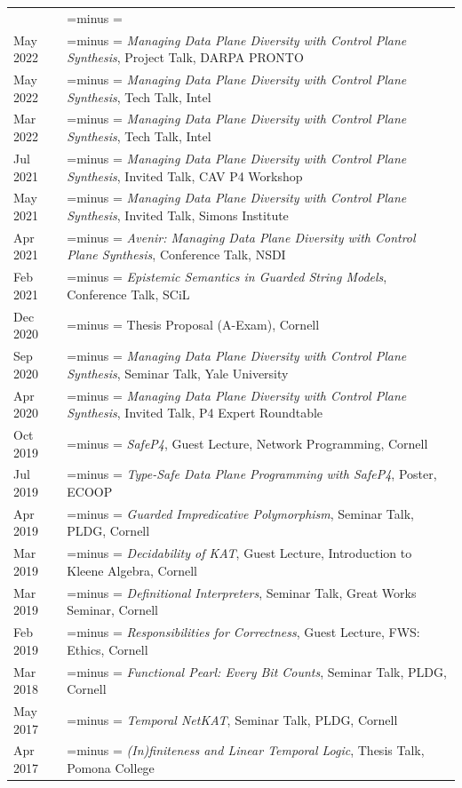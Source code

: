 \documentclass[letterpaper,10pt,oneside]{article}
\makeatletter
\newlength{\leftcol}  \setlength{\leftcol}{1.05in}
\newlength{\colsep}   \setlength{\colsep}{1em}
\newlength{\rightcol}
\newcommand{\balancedrag}{%
  \setlength{\rightskip}{0pt plus 0.45\rightcol}%
  \setlength{\parfillskip}{0pt}%
  \spaceskip=\fontdimen2\font minus \fontdimen4\font
  \xspaceskip=\spaceskip
  \hbadness=10000 \hyphenpenalty=10000 \exhyphenpenalty=10000 \emergencystretch=0pt}
\newenvironment{cvsection}[1]
  {\par\vspace{0.9em}%
   \setlength{\rightcol}{\dimexpr\linewidth-\leftcol-\colsep\relax}%
   \noindent\begin{longtable}[l]{@{}>{\raggedleft\arraybackslash}p{\leftcol}@{\hspace{\colsep}}>{\raggedright\balancedrag\arraybackslash}p{\rightcol}@{}}
   \multicolumn{2}{@{}l}{\Large #1} \\*\noalign{\nobreak\vspace{0.4em}}}
  {\end{longtable}}
\makeatother
\begin{document}
\begin{cvsection}{Talks \& Posters}
  May 2022 & \textit{Managing Data Plane Diversity with Control Plane Synthesis}, Project Talk, DARPA PRONTO \\[0.3em]
  May 2022 & \textit{Managing Data Plane Diversity with Control Plane Synthesis}, Tech Talk, Intel \\[0.3em]
  Mar 2022 & \textit{Managing Data Plane Diversity with Control Plane Synthesis}, Tech Talk, Intel \\[0.3em]
  Jul 2021 & \textit{Managing Data Plane Diversity with Control Plane Synthesis}, Invited Talk, CAV P4 Workshop \\[0.3em]
  May 2021 & \textit{Managing Data Plane Diversity with Control Plane Synthesis}, Invited Talk, Simons Institute \\[0.3em]
  Apr 2021 & \textit{Avenir: Managing Data Plane Diversity with Control Plane Synthesis}, Conference Talk, NSDI \\[0.3em]
  Feb 2021 & \textit{Epistemic Semantics in Guarded String Models}, Conference Talk, SCiL \\[0.3em]
  Dec 2020 & Thesis Proposal (A-Exam), Cornell \\[0.3em]
  Sep 2020 & \textit{Managing Data Plane Diversity with Control Plane Synthesis}, Seminar Talk, Yale University \\[0.3em]
  Apr 2020 & \textit{Managing Data Plane Diversity with Control Plane Synthesis}, Invited Talk, P4 Expert Roundtable \\[0.3em]
  Oct 2019 & \textit{SafeP4}, Guest Lecture, Network Programming, Cornell \\[0.3em]
  Jul 2019 & \textit{Type-Safe Data Plane Programming with SafeP4}, Poster, ECOOP \\[0.3em]
  Apr 2019 & \textit{Guarded Impredicative Polymorphism}, Seminar Talk, PLDG, Cornell \\[0.3em]
  Mar 2019 & \textit{Decidability of KAT}, Guest Lecture, Introduction to Kleene Algebra, Cornell \\[0.3em]
  Mar 2019 & \textit{Definitional Interpreters}, Seminar Talk, Great Works Seminar, Cornell \\[0.3em]
  Feb 2019 & \textit{Responsibilities for Correctness}, Guest Lecture, FWS: Ethics, Cornell \\[0.3em]
  Mar 2018 & \textit{Functional Pearl: Every Bit Counts}, Seminar Talk, PLDG, Cornell \\[0.3em]
  May 2017 & \textit{Temporal NetKAT}, Seminar Talk, PLDG, Cornell \\[0.3em]
  Apr 2017 & \textit{(In)finiteness and Linear Temporal Logic}, Thesis Talk, Pomona College \\[0.3em]
\end{cvsection}
\end{document}
